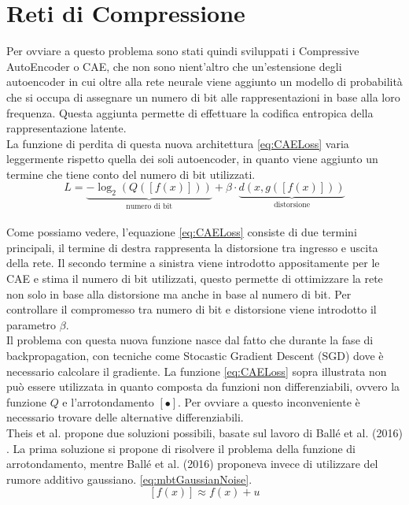\section{Reti di Compressione}
Per ovviare a questo problema sono stati quindi sviluppati i Compressive AutoEncoder o CAE, che non sono nient’altro che un’estensione degli autoencoder in cui oltre alla rete neurale viene aggiunto un modello di probabilità che si occupa di assegnare un numero di bit alle rappresentazioni in base alla loro frequenza. Questa aggiunta permette di effettuare la codifica entropica della rappresentazione latente. \cite{theis2017lossy}\\
La funzione di perdita di questa nuova architettura \ref{eq:CAELoss} varia leggermente rispetto quella dei soli autoencoder, in quanto viene aggiunto un termine che tiene conto del numero di bit utilizzati. 
\begin{equation}\label{eq:CAELoss}
    L = \underbrace{- \log_{2}(Q([f(x)]))}_{\textrm{numero di bit}} + \beta \cdot \underbrace{d(x,g([f(x)]))}_{\textrm{distorsione}}
\end{equation}\\
Come possiamo vedere, l’equazione \ref{eq:CAELoss} consiste di due termini principali, il termine di destra rappresenta la distorsione tra ingresso e uscita della rete. Il secondo termine a sinistra viene introdotto appositamente per le CAE e stima il numero di bit utilizzati, questo permette di ottimizzare la rete non solo in base alla distorsione ma anche in base al numero di bit. Per controllare il compromesso tra numero di bit e distorsione viene introdotto il parametro $\beta$.\\
Il problema con questa nuova funzione nasce dal fatto che durante la fase di backpropagation, con tecniche come Stocastic Gradient Descent (SGD) dove è necessario calcolare il gradiente. La funzione \ref{eq:CAELoss} sopra illustrata non può essere utilizzata in quanto composta da funzioni non differenziabili, ovvero la funzione $Q$ e l’arrotondamento $[\bullet]$. Per ovviare a questo inconveniente è necessario trovare delle alternative differenziabili.\\
Theis et al. \cite{theis2017lossy} propone due soluzioni possibili, basate sul lavoro di Ballé et al. (2016) \cite{balle2018variational}. La prima soluzione si propone di risolvere il problema della funzione di arrotondamento, mentre Ballé et al. (2016) proponeva invece di utilizzare del rumore additivo gaussiano. \ref{eq:mbtGaussianNoise}.\\
\begin{equation}\label{eq:mbtGaussianNoise}
    [f(x)] \approx f(x) + u
\end{equation}\\
